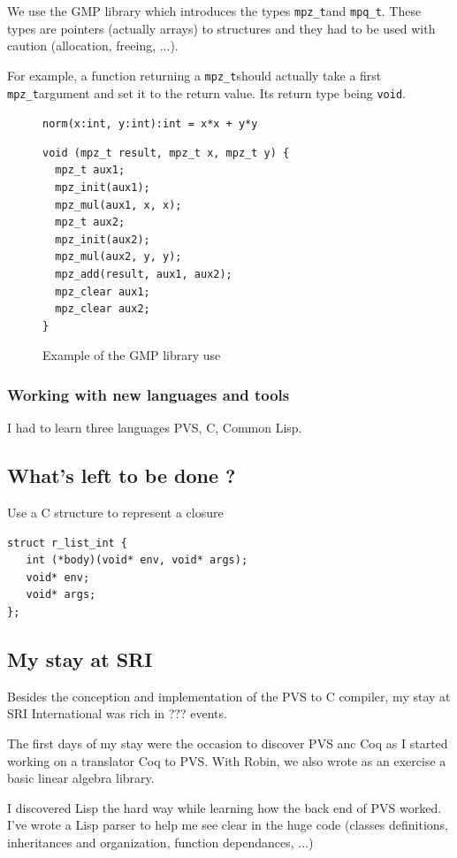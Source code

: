 \documentclass[12pt,a4paper,titlepage]{article}
\newcommand{\cl}[1]{\texttt{#1}}
\newcommand{\mpzt}{\texttt{mpz\_t}}
\newcommand{\mpqt}{\texttt{mpq\_t}}
\begin{document}
We use the GMP library which introduces the types \mpzt and \mpqt. These types are pointers (actually arrays) to structures and they had to be used with caution (allocation, freeing, ...).

For example, a function returning a \mpzt should actually take a first \mpzt argument and set it to the return value. Its return type being \cl{void}.

\begin{figure}[!ht]
\cl{norm(x:int, y:int):int = x*x + y*y}
\begin{lstlisting}
void (mpz_t result, mpz_t x, mpz_t y) {
  mpz_t aux1;
  mpz_init(aux1);
  mpz_mul(aux1, x, x);
  mpz_t aux2;
  mpz_init(aux2);
  mpz_mul(aux2, y, y);
  mpz_add(result, aux1, aux2);
  mpz_clear aux1;
  mpz_clear aux2;
}
\end{lstlisting}
\caption{Example of the GMP library use}
\end{figure}


\subsubsection{Working with new languages and tools}
I had to learn three languages PVS, C, Common Lisp.



\subsection{What's left to be done ?}

Use a C structure to represent a closure
\begin{lstlisting}
struct r_list_int {
   int (*body)(void* env, void* args);
   void* env;
   void* args;
};
\end{lstlisting}



\subsection{My stay at SRI}

Besides the conception and implementation of the PVS to C compiler, my stay at SRI International was rich in ??? events.

The first days of my stay were the occasion to discover PVS anc Coq as I started working on a translator Coq to PVS. With Robin, we also wrote as an exercise a basic linear algebra library.

I discovered Lisp the hard way while learning how the back end of PVS worked. I've wrote a Lisp parser to help me see clear in the huge code (classes definitions, inheritances and organization, function dependances, ...)
\end{document}
